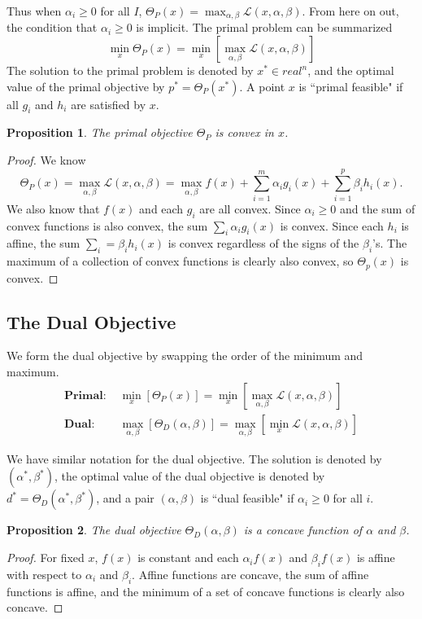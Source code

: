 \documentclass{article}
\newtheorem{prop}{Proposition}
\begin{document}
Thus when $\alpha_i \geq 0$ for all $I$, $\Theta_P(x) = \max_{\alpha,\beta} \mathcal{L}(x,\alpha,\beta)$. From here on out, the condition that $\alpha_i \geq 0$ is implicit. The primal problem can be summarized
\[
	\min_x \Theta_P(x) = \min_x \left[ \max_{\alpha,\beta}\mathcal{L}(x,\alpha,\beta) \right]
\] 
The solution to the primal problem is denoted by $x^* \in real^n$, and the optimal value of the primal objective by $p^* = \Theta_P(x^*)$. A point $x$ is ``primal feasible" if all $g_i$ and $h_i$ are satisfied by $x$.

\begin{prop}
	The primal objective $\Theta_P$ is convex in $x$.
\end{prop}
\begin{proof}
	We know
	\[
		\Theta_P(x) = \max_{\alpha,\beta}\mathcal{L}(x,\alpha,\beta) = \max_{\alpha,\beta} f(x) + \sum_{i=1}^{m} \alpha_i g_i(x) + \sum_{i=1}^{p} \beta_i h_i(x).
	\] 
	We also know that $f(x)$ and each $g_i$ are all convex. Since $\alpha_i \geq 0$ and the sum of convex functions is also convex, the sum $\sum_i \alpha_i g_i(x)$ is convex. Since each $h_i$ is affine, the sum $\sum_i = \beta_i h_i(x)$ is convex regardless of the signs of the $\beta_i$'s. The maximum of a collection of convex functions is clearly also convex, so $\Theta_p(x)$ is convex.
\end{proof}



\subsection{The Dual Objective}
We form the dual objective by swapping the order of the minimum and maximum.
\begin{align*}
	\textbf{Primal: } &\min_x \left[ \Theta_P(x) \right] =  \min_x \left[ \max_{\alpha,\beta}\mathcal{L}(x,\alpha,\beta) \right] \\
	\textbf{Dual: } &\max_{\alpha,\beta} \left[ \Theta_D(\alpha,\beta) \right] = \max_{\alpha,\beta} \left[ \min_x \mathcal{L}(x,\alpha,\beta) \right]
\end{align*}

We have similar notation for the dual objective. The solution is denoted by $(\alpha^*, \beta^*)$, the optimal value of the dual objective is denoted by $d^* = \Theta_D(\alpha^*,\beta^*)$, and a pair $(\alpha,\beta)$ is ``dual feasible" if $\alpha_i \geq 0$ for all $i$.

\begin{prop}
	The dual objective $\Theta_D(\alpha,\beta)$ is a concave function of $\alpha$ and $\beta$.
\end{prop}
\begin{proof}
	For fixed $x$, $f(x)$ is constant and each $\alpha_i f(x)$ and $\beta_i f(x)$ is affine with respect to $\alpha_i$ and $\beta_i$. Affine functions are concave, the sum of affine functions is affine, and the minimum of a set of concave functions is clearly also concave.
\end{proof}
\end{document}
